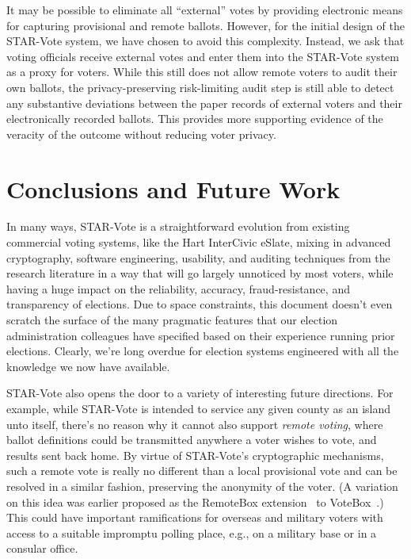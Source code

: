 \documentclass[letterpaper, 10pt, twocolumn]{article}
\newcommand{\projname}{STAR-Vote\xspace}
\begin{document}
It may be possible to eliminate all ``external'' votes by providing electronic means for capturing provisional and remote ballots.  However, for the initial design of the \projname system, we have chosen to avoid this complexity.  Instead, we ask that voting officials receive external votes and enter them into the \projname system as a proxy for voters.  While this still does not allow remote voters to audit their own ballots, the privacy-preserving risk-limiting audit step is still able to detect any substantive deviations between the paper records of external voters and their electronically recorded ballots.  This provides more supporting evidence of the veracity of the outcome without reducing voter privacy.



\section{Conclusions and Future Work}

\label{sec:future}
\label{sec:conclusion}

In many ways, \projname is a straightforward evolution from existing
commercial voting systems, like the Hart InterCivic eSlate, mixing in
advanced cryptography, software engineering, usability, and auditing
techniques from the research literature in a way that will go largely
unnoticed by most voters, while having a huge impact on the
reliability, accuracy, fraud-resistance, and transparency of
elections. Due to space constraints, this document doesn't even
scratch the surface of the many pragmatic features that our election
administration colleagues have specified based on their experience
running prior elections. Clearly, we're long overdue for election
systems engineered with all the knowledge we now have available.

\projname also opens the door to a variety of interesting future
directions. For example, while \projname is intended to service any
given county as an island unto itself, there's no reason why it cannot
also support {\em remote voting}, where ballot definitions could be
transmitted anywhere a voter wishes to vote, and results sent back
home. By virtue of \projname's cryptographic mechanisms, such a remote
vote is really no different than a local provisional vote and can be
resolved in a similar fashion, preserving the anonymity of the
voter. (A variation on this idea was earlier proposed as the RemoteBox
extension~\cite{remotebox08} to VoteBox~\cite{sandler08votebox}.)
This could have important ramifications for overseas and military
voters with access to a suitable impromptu polling place, e.g., on a
military base or in a consular office.
\end{document}
